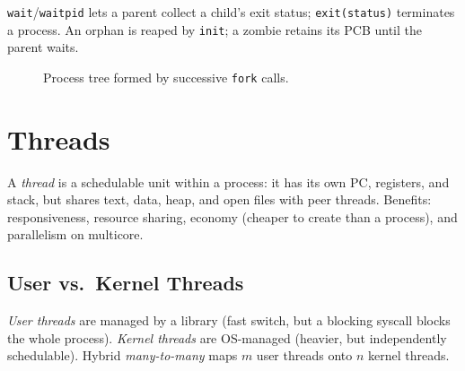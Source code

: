 \texttt{wait}/\texttt{waitpid} lets a parent collect a child's exit status;
\texttt{exit(status)} terminates a process. An orphan is reaped by \texttt{init};
a zombie retains its PCB until the parent waits.

\begin{figure}[h!]
\centering
{}
\caption{Process tree formed by successive \texttt{fork} calls.}
\label{fig:fork-tree}
\end{figure}

\section{Threads}
\label{sec:threads}

A \emph{thread} is a schedulable unit within a process: it has its own PC,
registers, and stack, but shares text, data, heap, and open files with peer
threads. Benefits: responsiveness, resource sharing, economy (cheaper to create
than a process), and parallelism on multicore.

\subsection{User vs.\ Kernel Threads}
\textit{User threads} are managed by a library (fast switch, but a blocking
syscall blocks the whole process). \textit{Kernel threads} are OS-managed
(heavier, but independently schedulable). Hybrid \textit{many-to-many} maps
$m$ user threads onto $n$ kernel threads.

